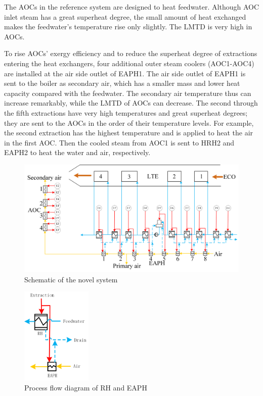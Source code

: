 \documentclass[preprint,12pt]{elsarticle}
\begin{document}
The AOCs in the reference system are designed to heat feedwater.
Although AOC inlet steam has a great superheat degree, the small amount of heat exchanged makes the feedwater's temperature rise only slightly.
The LMTD is very high in AOCs.

To rise AOCs' exergy efficiency and to reduce the superheat degree of extractions entering the heat exchangers,
four additional outer steam coolers (AOC1-AOC4) are installed at the air side outlet of EAPH1.
The air side outlet of EAPH1 is sent to the boiler as secondary air, which has a smaller mass and lower heat capacity compared with the feedwater. 
The secondary air temperature thus can increase remarkably, while the LMTD of AOCs can decrease.
The second through the fifth extractions have very high temperatures and great superheat degrees; they are sent to the AOCs in the order of their temperature levels.
For example, the second extraction has the highest temperature and is applied to heat the air in the first AOC. Then the cooled steam from AOC1 is sent to HRH2 and EAPH2 to heat the water and air, respectively. 

\begin{figure}[htbp]
\centering
\includegraphics[width=1\textwidth]{fig/novel_system.png}
\caption{Schematic of the novel system} 
\label{fig:novel_system}
\end{figure}

\begin{figure}[htbp]
\centering
\includegraphics[width=0.3\textwidth]{fig/extracion_heat_APH.png}
\caption{Process flow diagram of RH and EAPH} 
\label{fig:extraction_heat_APH}
\end{figure}
\end{document}
